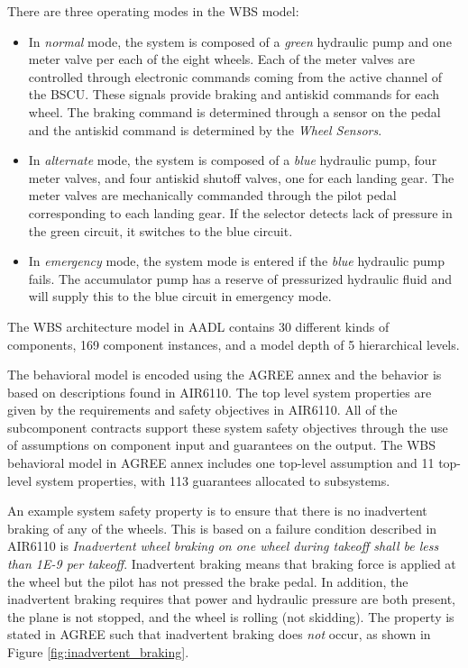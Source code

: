 There are three operating modes in the WBS model:

\begin{itemize}
	\renewcommand{\labelitemi}{\textbullet}
	\item In \textit{normal} mode, the system is composed of a \textit{green} hydraulic pump and one meter valve per each of the eight wheels. Each of the meter valves are controlled through electronic commands coming from the active channel of the BSCU. These signals provide braking and antiskid commands for each wheel. The braking command is determined through a sensor on the pedal and the antiskid command is determined by the \textit{Wheel Sensors}. 
	\item In \textit{alternate} mode, the system is composed of a \textit{blue} hydraulic pump, four meter valves, and four antiskid shutoff valves, one for each landing gear. The meter valves are mechanically commanded through the pilot pedal corresponding to each landing gear. If the selector detects lack of pressure in the green circuit, it switches to the blue circuit. 
	\item In \textit{emergency} mode, the system mode is entered if the \textit{blue} hydraulic pump fails. The accumulator pump has a reserve of pressurized hydraulic fluid and will supply this to the blue circuit in emergency mode. 
\end{itemize}

The WBS architecture model in AADL contains 30 different kinds of components, 169 component instances, and a model depth of 5 hierarchical levels. 

The behavioral model is encoded using the AGREE annex and the behavior is based on descriptions found in AIR6110. The top level system properties are given by the requirements and safety objectives in AIR6110. All of the subcomponent contracts support these system safety objectives through the use of assumptions on component input and guarantees on the output. The WBS behavioral model in AGREE annex includes one top-level assumption and  11 top-level system properties, with 113 guarantees allocated to subsystems.  

An example system safety property is to ensure that there is no inadvertent braking of any of the wheels. This is based on a failure condition described in AIR6110 is \textit{Inadvertent wheel braking on one wheel during takeoff shall be less than 1E-9 per takeoff}. 
Inadvertent braking means that braking force is applied at the wheel but the pilot has not pressed the brake pedal.  In addition, the inadvertent braking requires that power and hydraulic pressure are both present, the plane is not stopped, and the wheel is rolling (not skidding). The property is stated in AGREE such that inadvertent braking does \textit{not} occur, as shown in Figure \ref{fig:inadvertent_braking}. 

